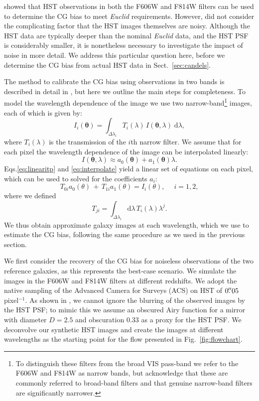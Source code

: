 \documentclass[useAMS,usenatbib]{mnras}
\renewcommand{\d}{\mathrm{d}}
\newcommand{\be}{\begin{equation}}
\newcommand{\ee}{\end{equation}}
\def\elabel#1{\label{eq:#1}}
\begin{document}
 showed that HST observations  in both the F606W and F814W filters can be used to determine the CG bias to meet {\it Euclid} requirements. However,  did not consider the complicating factor that the HST images themselves are noisy. Although the HST data are typically deeper than the nominal {\it Euclid} data, and the HST PSF is considerably smaller, it is nonetheless necessary to investigate the impact of noise in more detail. We address this particular question here, before we determine the CG bias from actual HST data in Sect.~\ref{sec:candels}.

The method to calibrate the CG bias using observations in two bands is described in detail
in , but here we outline the main steps for completeness. To model the
wavelength dependence of the image we use two narrow-band\footnote{To distinguish these filters from the broad VIS pass-band we refer to the F606W and F814W as narrow bands, but acknowledge that these are commonly referred to broad-band filters and that genuine narrow-band filters are significantly narrower.} images, each of which is given by:
%
\be
I_i({\bm\theta}) = \int_{\Delta \lambda_i} T_i(\lambda)\, I({\bm \theta},\lambda) \;\d \lambda,
\elabel{linearitp}
\ee
%
where $T_i(\lambda)$ is the transmission of the $i$th narrow filter. We assume that for each pixel the wavelength dependence of the image can be interpolated linearly:
%
\be
I({\bm \theta},\lambda) \approx  a_0({\bm \theta})+a_1({\bm \theta})\lambda.
\elabel{interpolate}
\ee
%
Eqs.\ref{eq:linearitp} and \ref{eq:interpolate} yield a linear set of
equations on each pixel, which can be used to solved for the
coefficients $a_i$:
%
\be
T_{0i} a_0(\theta) \,+\,T_{1i} a_1(\theta) = I_i(\theta), \quad\; i=1,2,
\elabel{lineareq}
\ee
%
where we defined 
\be
T_{ji}=\int_{\Delta\lambda_i} \d \lambda\,T_i(\lambda)\lambda^j. 
\ee
%
We thus obtain approximate galaxy images at each wavelength, which we use to estimate the CG bias, following the same procedure as we used in the previous section.

We first consider the recovery of the CG bias for noiseless observations of the two reference galaxies, as this represents the best-case scenario. We simulate the images in the F606W and F814W filters at different redshifts. We adopt the native sampling of the Advanced Camera for Surveys (ACS) on HST of  $0\hbox{$.\!\!^{\prime\prime}$}05$ pixel$^{-1}$. As shown in , we cannot ignore the blurring of the observed images by the HST PSF; to mimic this we assume an obscured Airy function for a mirror with diameter $D=2.5$ and obscuration  $0.33$ as a proxy for the HST PSF. We deconvolve our synthetic HST images and create the images at different wavelengths as the starting point for the flow presented in Fig.~\ref{fig:flowchart}.
\end{document}

